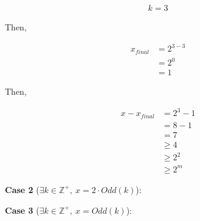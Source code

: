 \documentclass[12pt]{article}
\begin{document}
\begin{enumerate}[a.]
    \begin{align}
        k = 3
    \end{align}

    \bigskip

    Then,

    \begin{align}
        x_{final} &= 2^{3-3}\\
        &= 2^0\\
        &= 1
    \end{align}

    \bigskip

    Then,

    \bigskip

    \begin{align}
        x - x_{final} &= 2^3 - 1\\
        &= 8 - 1\\
        &= 7\\
        &\geq 4\\
        &\geq 2^2\\
        &\geq 2^m
    \end{align}

    \bigskip

    \textbf{Case 2} ($\exists k \in \mathbb{Z}^{+},\:x = 2 \cdot Odd(k)$):

    \bigskip

    \textbf{Case 3} ($\exists k \in \mathbb{Z}^{+},\:x = Odd(k)$):


\end{enumerate}
\end{document}
